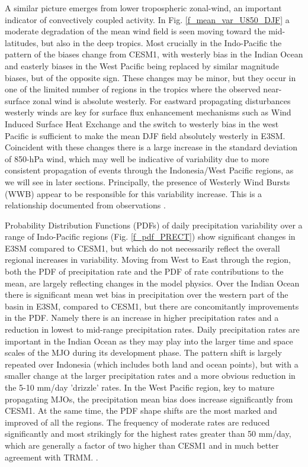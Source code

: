 \documentclass[draft,ms]{AGUTeX}
\begin{document}
\begin{article}
A similar picture emerges from lower tropospheric zonal-wind, an important indicator of convectively coupled activity. In Fig. \ref{f_mean_var_U850_DJF} a moderate degradation of the mean wind field is seen moving toward the mid-latitudes, but also in the deep tropics. Most crucially in the Indo-Pacific the pattern of the biases change from CESM1, with westerly bias in the Indian Ocean and easterly biases in the West Pacific being replaced by similar magnitude biases, but of the opposite sign. These changes may be minor, but they occur in one of the limited number of regions in the tropics where the observed near-surface zonal wind is absolute westerly. For eastward propagating disturbances westerly winds are key for surface flux enhancement mechanisms such as Wind Induced Surface Heat Exchange \cite[WISHE,][]{Neelin1987,Emanuel1987} and the switch to westerly bias in the west Pacific is sufficient to make the mean DJF field absolutely westerly in E3SM. Coincident with these changes there is a large increase in the standard deviation of 850-hPa wind, which may well be indicative of variability due to more consistent propagation of events through the Indonesia/West Pacific regions, as we will see in later sections. Principally, the presence of Westerly Wind Bursts (WWB) appear to be responsible for this variability increase. This is a relationship documented from observations \citep{Fasullo2007a}.

Probability Distribution Functions (PDFs) of daily precipitation variability over a range of Indo-Pacific regions (Fig. \ref{f_pdf_PRECT}) show significant changes in E3SM compared to CESM1, but which do not necessarily reflect the overall regional increases in variability. Moving from West to East through the region, both the PDF of precipitation rate and the PDF of rate contributions to the mean, are largely reflecting changes in the model physics. Over the Indian Ocean there is significant mean wet bias in precipitation over the western part of the basin in E3SM, compared to CESM1, but there are concomitantly improvements in the PDF. Namely there is an increase in higher precipitation rates and a reduction in lowest to mid-range precipitation rates. Daily precipitation rates are important in the Indian Ocean as they may play into the larger time and space scales of the MJO during its development phase. The pattern shift is largely repeated over Indonesia (which includes both land and ocean points), but with a smaller change at the larger precipitation rates and a more obvious reduction in the 5-10 mm/day 'drizzle' rates. In the West Pacific region, key to mature propagating MJOs, the precipitation mean bias does increase significantly from CESM1. At the same time, the PDF shape shifts are the most marked and improved of all the regions. The frequency of moderate rates are reduced significantly and most strikingly for the highest rates greater than 50 mm/day, which are generally a factor of two higher than CESM1 and in much better agreement with TRMM. .


\end{article}
\end{document}
